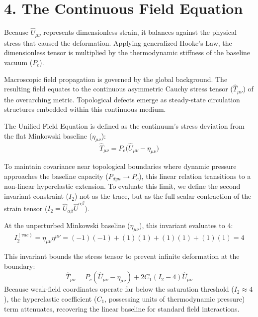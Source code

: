 \section*{4. The Continuous Field Equation}
Because $\hat{U}_{\mu\nu}$ represents dimensionless strain, it balances against the physical stress that caused the deformation. Applying generalized Hooke's Law, the dimensionless tensor is multiplied by the thermodynamic stiffness of the baseline vacuum ($P_c$).

Macroscopic field propagation is governed by the global background. The resulting field equates to the continuous asymmetric Cauchy stress tensor ($\hat{T}_{\mu\nu}$) of the overarching metric. Topological defects emerge as steady-state circulation structures embedded within this continuous medium. 

The Unified Field Equation is defined as the continuum's stress deviation from the flat Minkowski baseline ($\eta_{\mu\nu}$):
\begin{equation}
    \hat{T}_{\mu\nu} = P_c \Big( \hat{U}_{\mu\nu} - \eta_{\mu\nu} \Big) \label{eq:field_equation}
\end{equation}

To maintain covariance near topological boundaries where dynamic pressure approaches the baseline capacity ($P_{dyn} \to P_c$), this linear relation transitions to a non-linear hyperelastic extension. To evaluate this limit, we define the second invariant constraint ($I_2$) not as the trace, but as the full scalar contraction of the strain tensor ($I_2 = \hat{U}_{\alpha\beta}\hat{U}^{\alpha\beta}$).

At the unperturbed Minkowski baseline ($\eta_{\mu\nu}$), this invariant evaluates to 4: 
\begin{equation} 
    I_2^{(vac)} = \eta_{\mu\nu}\eta^{\mu\nu} = (-1)(-1) + (1)(1) + (1)(1) + (1)(1) = 4 
\end{equation} 

This invariant bounds the stress tensor to prevent infinite deformation at the boundary:
\begin{equation}
    \hat{T}_{\mu\nu} = P_c \left( \hat{U}_{\mu\nu} - \eta_{\mu\nu} \right) + 2C_1 \left( I_2 - 4 \right) \hat{U}_{\mu\nu} \label{eq:hyperelastic_tensor} 
\end{equation}
Because weak-field coordinates operate far below the saturation threshold ($I_2 \approx 4$), the hyperelastic coefficient ($C_1$, possessing units of thermodynamic pressure) term attenuates, recovering the linear baseline for standard field interactions. 

